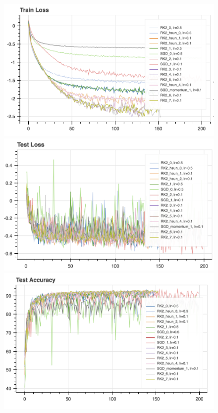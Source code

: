 \begin{figure}[htb]
\includegraphics[scale=0.5]{plots/wide_resnet16.png}
\includegraphics[scale=0.5]{plots/wide_resnet16_1.png}
\includegraphics[scale=0.5]{plots/wide_resnet16_2.png}

\end{figure}
